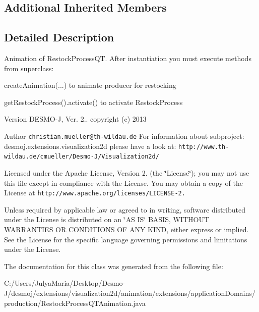 \subsection*{Additional Inherited Members}


\subsection{Detailed Description}
Animation of Restock\-Process\-Q\-T. After instantiation you must execute methods from superclass\-:\par
 create\-Animation(...) to animate producer for restocking\par
 get\-Restock\-Process().activate() to activate Restock\-Process

\begin{DoxyVersion}{Version}
D\-E\-S\-M\-O-\/\-J, Ver. 2.. copyright (c) 2013 
\end{DoxyVersion}
\begin{DoxyAuthor}{Author}
{\tt christian.\-mueller@th-\/wildau.\-de} For information about subproject\-: desmoj.\-extensions.\-visualization2d please have a look at\-: {\tt http\-://www.\-th-\/wildau.\-de/cmueller/\-Desmo-\/\-J/\-Visualization2d/}
\end{DoxyAuthor}
Licensed under the Apache License, Version 2. (the \char`\"{}\-License\char`\"{}); you may not use this file except in compliance with the License. You may obtain a copy of the License at {\tt http\-://www.\-apache.\-org/licenses/\-L\-I\-C\-E\-N\-S\-E-\/2.}

Unless required by applicable law or agreed to in writing, software distributed under the License is distributed on an \char`\"{}\-A\-S I\-S\char`\"{} B\-A\-S\-I\-S, W\-I\-T\-H\-O\-U\-T W\-A\-R\-R\-A\-N\-T\-I\-E\-S O\-R C\-O\-N\-D\-I\-T\-I\-O\-N\-S O\-F A\-N\-Y K\-I\-N\-D, either express or implied. See the License for the specific language governing permissions and limitations under the License. 

The documentation for this class was generated from the following file\-:\begin{DoxyCompactItemize}
\item 
C\-:/\-Users/\-Julya\-Maria/\-Desktop/\-Desmo-\/\-J/desmoj/extensions/visualization2d/animation/extensions/application\-Domains/production/Restock\-Process\-Q\-T\-Animation.\-java\end{DoxyCompactItemize}
